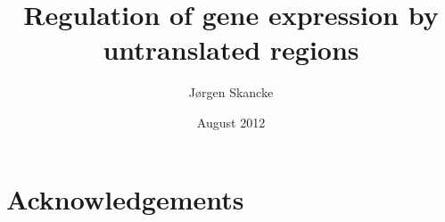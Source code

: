\documentclass[]{ntnuthesis}
\title{Regulation of gene expression by untranslated regions}
\author{J\o rgen Skancke}
\date{August 2012}
\begin{document}
 

\frontmatter


\chapter*{Acknowledgements}



\mainmatter


%

%
%

%

%
%
\end{document}
